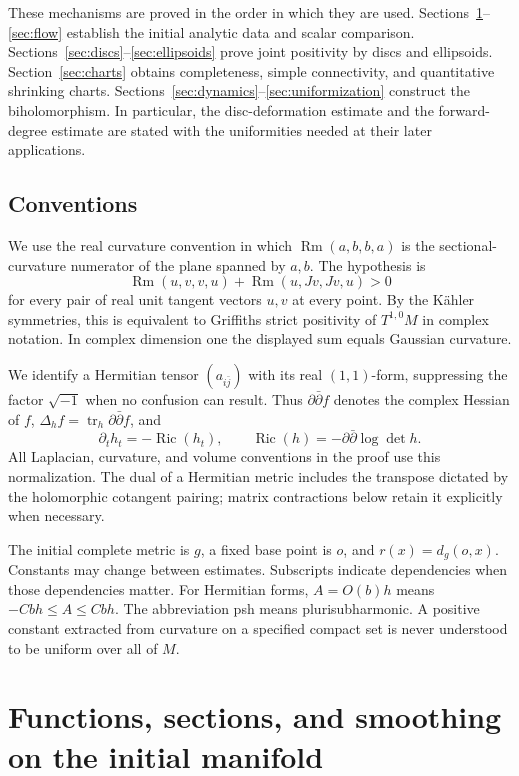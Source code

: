 \documentclass[11pt]{article}
\theoremstyle{definition}
\theoremstyle{remark}
\newcommand{\dd}{\partial\bar\partial}
\DeclareMathOperator{\Ric}{Ric}
\DeclareMathOperator{\Rm}{Rm}
\DeclareMathOperator{\tr}{tr}
\numberwithin{equation}{section}
\begin{document}
These mechanisms are proved in the order in which they are used.
Sections~\ref{sec:preliminaries}--\ref{sec:flow} establish the initial
analytic data and scalar comparison. Sections~\ref{sec:discs}--\ref{sec:ellipsoids}
prove joint positivity by discs and ellipsoids.
Section~\ref{sec:charts} obtains completeness, simple connectivity,
and quantitative shrinking charts.
Sections~\ref{sec:dynamics}--\ref{sec:uniformization} construct the
biholomorphism. In particular, the disc-deformation estimate and
the forward-degree estimate are stated with the uniformities
needed at their later applications.

\subsection{Conventions}

We use the real curvature convention in which
$\Rm(a,b,b,a)$ is the sectional-curvature numerator of the plane
spanned by $a,b$. The hypothesis is
\[
 \Rm(u,v,v,u)+\Rm(u,Jv,Jv,u)>0
\]
for every pair of real unit tangent vectors $u,v$ at every point.
By the K\"ahler symmetries, this is equivalent to Griffiths strict
positivity of $T^{1,0}M$ in complex notation. In complex dimension
one the displayed sum equals Gaussian curvature.

We identify a Hermitian tensor $(a_{i\bar j})$ with its real
$(1,1)$-form, suppressing the factor $\sqrt{-1}$ when no confusion
can result. Thus $\dd f$ denotes the complex Hessian of $f$,
$\Delta_h f=\tr_h\dd f$, and
\[
 \partial_t h_t=-\Ric(h_t),\qquad
 \Ric(h)=-\dd\log\det h.
\]
All Laplacian, curvature, and volume conventions in the proof use
this normalization. The dual of a Hermitian metric includes the
transpose dictated by the holomorphic cotangent pairing; matrix
contractions below retain it explicitly when necessary.

The initial complete metric is $g$, a fixed base point is $o$,
and $r(x)=d_g(o,x)$. Constants may change between estimates.
Subscripts indicate dependencies when those dependencies matter.
For Hermitian forms, $A=O(b)h$ means $-Cbh\leq A\leq Cbh$.
The abbreviation psh means plurisubharmonic. A positive constant
extracted from curvature on a specified compact set is never
understood to be uniform over all of $M$.

\section{Functions, sections, and smoothing on the initial manifold}
\label{sec:preliminaries}
\end{document}
